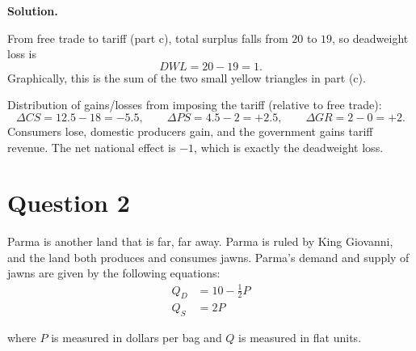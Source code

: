 \documentclass[12pt]{article}
\newenvironment{solution}{\par\noindent\textbf{Solution.}\par}{\vspace{1em}}
\begin{document}
\begin{enumerate}[label=(\alph*)]
\begin{solution}
\medskip

From free trade to tariff (part c), total surplus falls from $20$ to $19$, so deadweight loss is
$$
DWL = 20-19=1.
$$
Graphically, this is the sum of the two small yellow triangles in part (c).

\medskip

Distribution of gains/losses from imposing the tariff (relative to free trade):
$$
\Delta CS = 12.5-18 = -5.5,\qquad
\Delta PS = 4.5-2 = +2.5,\qquad
\Delta GR = 2-0 = +2.
$$
Consumers lose, domestic producers gain, and the government gains tariff revenue.
The net national effect is $-1$, which is exactly the deadweight loss.
\end{solution}
\end{enumerate}

\clearpage
\section*{Question 2}

Parma is another land that is far, far away. Parma is ruled by King Giovanni, and the land both produces and consumes jawns. Parma's demand and supply of jawns are given by the following equations:
\begin{align*}
    Q_D &= 10 - \frac 1 2 P \\
    Q_S &= 2P
\end{align*}

where $P$ is measured in dollars per bag and $Q$ is measured in flat units.
\end{document}
